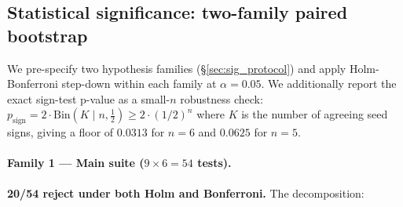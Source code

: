 \documentclass[10pt,a4paper]{article}
\begin{document}
\subsection{Statistical significance: two-family paired bootstrap}
\label{sec:significance}

We pre-specify two hypothesis families (\S\ref{sec:sig_protocol}) and apply Holm-Bonferroni step-down within each family at $\alpha = 0.05$. We additionally report the exact sign-test p-value as a small-$n$ robustness check: $p_{\text{sign}} = 2 \cdot \mathrm{Bin}(K \mid n, \tfrac{1}{2}) \ge 2 \cdot (1/2)^n$ where $K$ is the number of agreeing seed signs, giving a floor of $0.0313$ for $n=6$ and $0.0625$ for $n=5$.

\paragraph{Family 1 — Main suite ($9 \times 6 = 54$ tests).}
\textbf{20/54 reject under both Holm and Bonferroni.} The decomposition:
\end{document}
